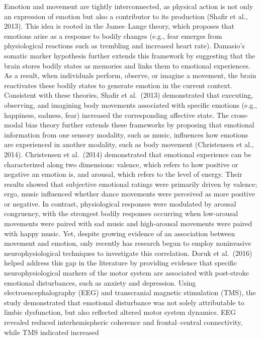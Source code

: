 \documentclass[
]{article}
\begin{document}
Emotion and movement are tightly interconnected, as physical action is
not only an expression of emotion but also a contributor to its
production (Shafir et al., 2013). This idea is rooted in the
James--Lange theory, which proposes that emotions arise as a response to
bodily changes (e.g., fear emerges from physiological reactions such as
trembling and increased heart rate). Damasio's somatic marker hypothesis
further extends this framework by suggesting that the brain stores
bodily states as memories and links them to emotional experiences. As a
result, when individuals perform, observe, or imagine a movement, the
brain reactivates these bodily states to generate emotion in the current
context. Consistent with these theories, Shafir et al.~(2013)
demonstrated that executing, observing, and imagining body movements
associated with specific emotions (e.g., happiness, sadness, fear)
increased the corresponding affective state. The cross-modal bias theory
further extends these frameworks by proposing that emotional information
from one sensory modality, such as music, influences how emotions are
experienced in another modality, such as body movement (Christensen et
al., 2014). Christensen et al.~(2014) demonstrated that emotional
experience can be characterized along two dimensions: valence, which
refers to how positive or negative an emotion is, and arousal, which
refers to the level of energy. Their results showed that subjective
emotional ratings were primarily driven by valence; ergo, music
influenced whether dance movements were perceived as more positive or
negative. In contrast, physiological responses were modulated by arousal
congruency, with the strongest bodily responses occurring when
low-arousal movements were paired with sad music and high-arousal
movements were paired with happy music. Yet, despite growing evidence of
an association between movement and emotion, only recently has research
begun to employ noninvasive neurophysiological techniques to investigate
this correlation. Doruk et al.~(2016) helped address this gap in the
literature by providing evidence that specific neurophysiological
markers of the motor system are associated with post-stroke emotional
disturbances, such as anxiety and depression. Using
electroencephalography (EEG) and transcranial magnetic stimulation
(TMS), the study demonstrated that emotional disturbance was not solely
attributable to limbic dysfunction, but also reflected altered motor
system dynamics. EEG revealed reduced interhemispheric coherence and
frontal--central connectivity, while TMS indicated increased
\end{document}

